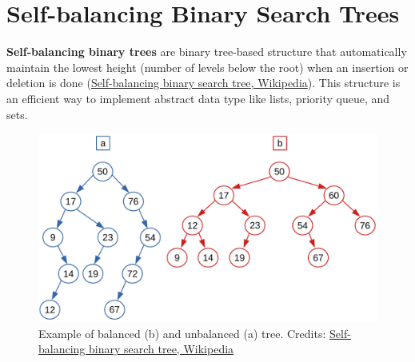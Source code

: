 \section{Self-balancing Binary Search Trees}
\textbf{Self-balancing binary trees} are binary tree-based structure that automatically maintain the lowest height (number of levels below the root) when an insertion or deletion is done \cite{wikiselfbalancing} (\href{https://en.wikipedia.org/wiki/Self-balancing_binary_search_tree}{Self-balancing binary search tree, Wikipedia}). This structure is an efficient way to implement abstract data type like lists, priority queue, and sets.

\begin{figure}[H]
	\begin{center}
		\includegraphics[scale=.6]{chapters/trees/images/trees_19.pdf}
		\caption[Example of balanced (b) and unbalanced (a) tree.]{Example of balanced (b) and unbalanced (a) tree. Credits: \href{https://en.wikipedia.org/wiki/Self-balancing_binary_search_tree}{Self-balancing binary search tree, Wikipedia}}
		\label{trees_19}
	\end{center}
\end{figure}

